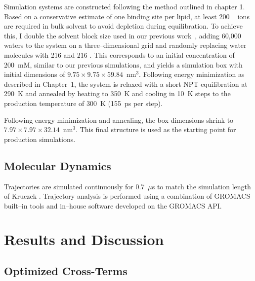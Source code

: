 Simulation systems are constructed following the method outlined in chapter 1.
Based on a conservative estimate of one binding site per lipid,
at least 200 \na~ ions are required in bulk solvent to avoid depletion during
equilibration. To achieve this, I double the solvent block size used in our
previous work~\cite{kruczek:2017,kruczek:2019}, adding 60,000 waters to the
system on a three--dimensional grid and randomly replacing water molecules with
216 \na and 216 \cl. This corresponds to an initial concentration of 200~mM,
similar to our previous simulations, and yields a simulation box with initial
dimensions of $9.75 \times 9.75 \times 59.84$~nm$^3$. Following energy minimization as described in Chapter~1, 
the system is relaxed with a short NPT equilibration
at 290~K and annealed by heating to 350~K and cooling in 10~K steps to the
production temperature of 300~K (155~ps per step).

Following energy minimization and annealing, the box dimensions shrink to
$7.97 \times 7.97 \times 32.14$~nm$^3$. This final structure is used as the
starting point for production simulations.

\subsection{Molecular Dynamics}
Trajectories are simulated continuously for 0.7~$\mu$s to match the 
simulation length of Kruczek \etal{}\cite{kruczek:2017,kruczek:2019}.
Trajectory analysis is performed using a combination of GROMACS built--in
tools and in--house software developed on the GROMACS API.

\section{Results and Discussion}

\subsection{Optimized Cross-Terms}

